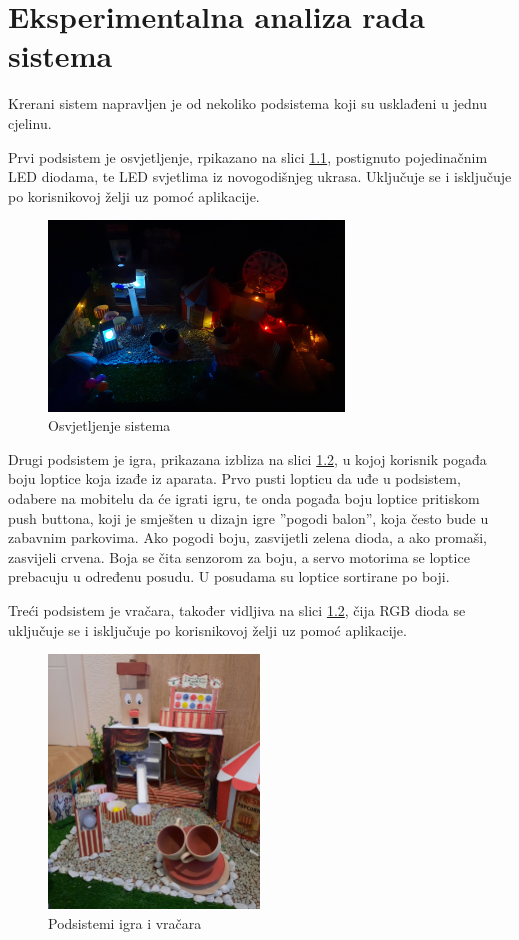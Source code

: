 \chapter{Eksperimentalna analiza rada sistema}

Krerani sistem napravljen je od nekoliko podsistema koji su usklađeni u jednu cjelinu.

Prvi podsistem je osvjetljenje, rpikazano na slici \ref{fig:Slika_osvjetljenje}, postignuto pojedinačnim LED diodama, te LED svjetlima iz novogodišnjeg ukrasa. Uključuje se i isključuje po korisnikovoj želji uz pomoć aplikacije. 

\begin{figure}[h!]
  \centering
  \includegraphics[width=0.7\textwidth]{svjetla}
  \caption{Osvjetljenje sistema}
  \label{fig:Slika_osvjetljenje}
\end{figure}

Drugi podsistem je igra, prikazana izbliza na slici \ref{fig:Slika_pod1}, u kojoj korisnik pogađa boju loptice koja izađe iz aparata. Prvo pusti lopticu da uđe u podsistem, odabere na mobitelu da će igrati igru, te onda pogađa boju loptice pritiskom push buttona, koji je smješten u dizajn igre ''pogodi balon'', koja često bude u zabavnim parkovima. Ako pogodi boju, zasvijetli zelena dioda, a ako promaši, zasvijeli crvena. Boja se čita senzorom za boju, a servo motorima se loptice prebacuju u određenu posudu. U posudama su loptice sortirane po boji.

Treći podsistem je vračara, također vidljiva na slici \ref{fig:Slika_pod1}, čija RGB dioda se uključuje se i isključuje po korisnikovoj želji uz pomoć aplikacije.

\begin{figure}[h!]
  \centering
  \includegraphics[width=0.5\textwidth]{pod1}
  \caption{Podsistemi igra i vračara}
  \label{fig:Slika_pod1}
\end{figure}

